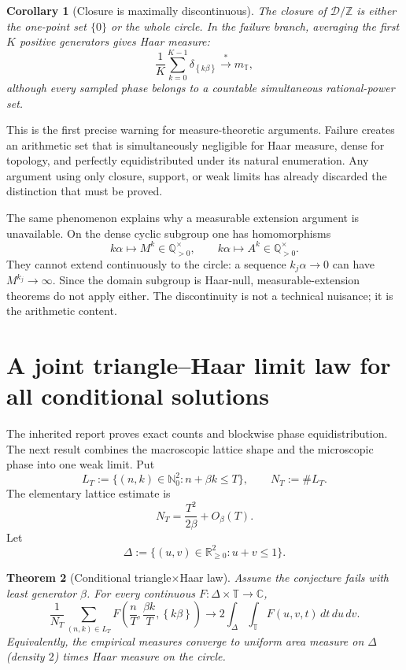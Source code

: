 \documentclass[11pt,oneside]{article}
\newtheorem{theorem}{Theorem}[section]
\newtheorem{corollary}[theorem]{Corollary}
\theoremstyle{definition}
\theoremstyle{remark}
\newcommand{\Nzero}{\mathbb N_0}
\newcommand{\Z}{\mathbb Z}
\newcommand{\Q}{\mathbb Q}
\newcommand{\R}{\mathbb R}
\newcommand{\C}{\mathbb C}
\newcommand{\Torus}{\mathbb T}
\newcommand{\fract}[1]{\left\{#1\right\}}
\begin{document}
\begin{corollary}[Closure is maximally discontinuous]
\label{mt:cor-closure-jump}
The closure of $\mathcal D/\Z$ is either the one-point set $\{0\}$ or the whole circle.  In the
failure branch, averaging the first $K$ positive generators gives Haar measure:
\[
  \frac1K\sum_{k=0}^{K-1}\delta_{\fract{k\beta}}
  \stackrel{*}{\longrightarrow}m_{\Torus},
\]
although every sampled phase belongs to a countable simultaneous rational-power set.
\end{corollary}

This is the first precise warning for measure-theoretic arguments.  Failure creates an
arithmetic set that is simultaneously negligible for Haar measure, dense for topology, and
perfectly equidistributed under its natural enumeration.  Any argument using only closure,
support, or weak limits has already discarded the distinction that must be proved.

The same phenomenon explains why a measurable extension argument is unavailable.  On the
dense cyclic subgroup one has homomorphisms
\[
  k\alpha\longmapsto M^k\in\Q_{>0}^{\times},
  \qquad
  k\alpha\longmapsto A^k\in\Q_{>0}^{\times}.
\]
They cannot extend continuously to the circle: a sequence $k_j\alpha\to0$ can have
$M^{k_j}\to\infty$.  Since the domain subgroup is Haar-null, measurable-extension theorems do
not apply either.  The discontinuity is not a technical nuisance; it is the arithmetic
content.

\section{A joint triangle--Haar limit law for all conditional solutions}
\label{mt:sec-triangle-haar}

The inherited report proves exact counts and blockwise phase equidistribution.  The next result
combines the macroscopic lattice shape and the microscopic phase into one weak limit.  Put
\begin{equation}
  L_T:=\{(n,k)\in\Nzero^2:n+\beta k\le T\},
  \qquad N_T:=\#L_T.
  \label{mt:eq-LT}
\end{equation}
The elementary lattice estimate is
\begin{equation}
  N_T=\frac{T^2}{2\beta}+O_\beta(T).
  \label{mt:eq-NT}
\end{equation}
Let
\[
  \Delta:=\{(u,v)\in\R_{\ge0}^2:u+v\le1\}.
\]

\begin{theorem}[Conditional triangle$\times$Haar law]
\label{mt:thm-triangle-haar}
Assume the conjecture fails with least generator $\beta$.  For every continuous
$F:\Delta\times\Torus\to\C$,
\begin{equation}
 \frac1{N_T}\sum_{(n,k)\in L_T}
 F\!\left(\frac nT,\frac{\beta k}{T},\fract{k\beta}\right)
 \longrightarrow
 2\int_\Delta\int_\Torus F(u,v,t)\,dt\,du\,dv.
 \label{mt:eq-triangle-haar}
\end{equation}
Equivalently, the empirical measures converge to uniform area measure on $\Delta$ (density
$2$) times Haar measure on the circle.
\end{theorem}
\end{document}
